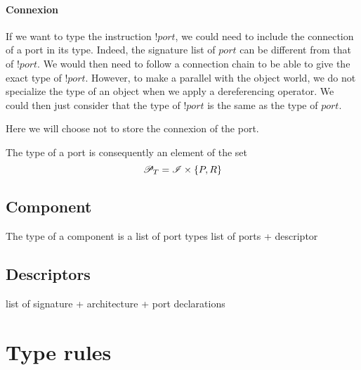 \paragraph{Connexion}
If we want to type the instruction $!port$, we could need to include the connection of a port in its type. Indeed, the signature list of $port$ can be different from that of $!port$. We would then need to follow a connection chain to be able to give the exact type of $!port$. However, to make a parallel with the object world, we do not specialize the type of an object when we apply a dereferencing operator. We could then just consider that the type of $!port$ is the same as the type of $port$. 

Here we will choose not to store the connexion of the port.

The type of a port is consequently an element of the set 
\[\mathcal{P}_T = \mathcal{I} \times \{P,R\}\]
\subsection{Component}
The type of a component is a list of port types 
list of ports + descriptor
\subsection{Descriptors}
list of signature + architecture + port declarations

\section{Type rules}

